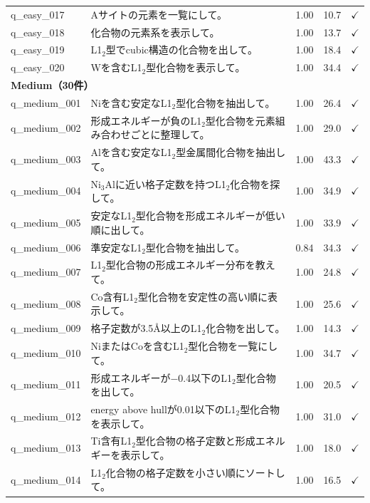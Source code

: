 \documentclass[5p,twocolumn]{elsarticle}
\begin{document}
\begin{longtable}{lp{8.5cm}ccl}
    q\_easy\_017 & Aサイトの元素を一覧にして。 & 1.00 & 10.7 & $\checkmark$ \\
    q\_easy\_018 & 化合物の元素系を表示して。 & 1.00 & 13.7 & $\checkmark$ \\
    q\_easy\_019 & L1$_2$型でcubic構造の化合物を出して。 & 1.00 & 18.4 & $\checkmark$ \\
    q\_easy\_020 & Wを含むL1$_2$型化合物を表示して。 & 1.00 & 34.4 & $\checkmark$ \\
    \midrule
    \multicolumn{5}{l}{\textbf{Medium（30件）}} \\
    \midrule
    q\_medium\_001 & Niを含む安定なL1$_2$型化合物を抽出して。 & 1.00 & 26.4 & $\checkmark$ \\
    q\_medium\_002 & 形成エネルギーが負のL1$_2$型化合物を元素組み合わせごとに整理して。 & 1.00 & 29.0 & $\checkmark$ \\
    q\_medium\_003 & Alを含む安定なL1$_2$型金属間化合物を抽出して。 & 1.00 & 43.3 & $\checkmark$ \\
    q\_medium\_004 & Ni$_3$Alに近い格子定数を持つL1$_2$化合物を探して。 & 1.00 & 34.9 & $\checkmark$ \\
    q\_medium\_005 & 安定なL1$_2$型化合物を形成エネルギーが低い順に出して。 & 1.00 & 33.9 & $\checkmark$ \\
    q\_medium\_006 & 準安定なL1$_2$型化合物を抽出して。 & 0.84 & 34.3 & $\checkmark$ \\
    q\_medium\_007 & L1$_2$型化合物の形成エネルギー分布を教えて。 & 1.00 & 24.8 & $\checkmark$ \\
    q\_medium\_008 & Co含有L1$_2$型化合物を安定性の高い順に表示して。 & 1.00 & 25.6 & $\checkmark$ \\
    q\_medium\_009 & 格子定数が3.5\AA 以上のL1$_2$化合物を出して。 & 1.00 & 14.3 & $\checkmark$ \\
    q\_medium\_010 & NiまたはCoを含むL1$_2$型化合物を一覧にして。 & 1.00 & 34.7 & $\checkmark$ \\
    q\_medium\_011 & 形成エネルギーが$-$0.4以下のL1$_2$型化合物を出して。 & 1.00 & 20.5 & $\checkmark$ \\
    q\_medium\_012 & energy above hullが0.01以下のL1$_2$型化合物を表示して。 & 1.00 & 31.0 & $\checkmark$ \\
    q\_medium\_013 & Ti含有L1$_2$型化合物の格子定数と形成エネルギーを表示して。 & 1.00 & 18.0 & $\checkmark$ \\
    q\_medium\_014 & L1$_2$化合物の格子定数を小さい順にソートして。 & 1.00 & 16.5 & $\checkmark$ \\

\end{longtable}
\end{document}
